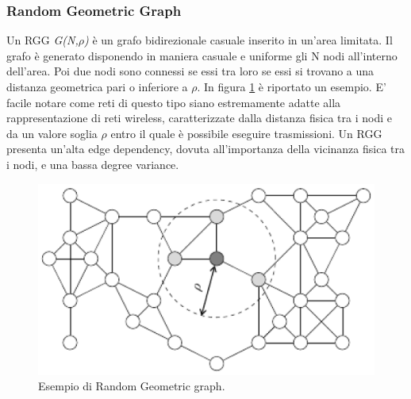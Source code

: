 \subsubsection{Random Geometric Graph}
\label{subsubsec:rgg}
Un \acf{RGG} \textit{G(N,$ \rho $)} è un grafo bidirezionale casuale inserito in un'area limitata. Il grafo è generato disponendo in maniera casuale e uniforme gli N nodi all'interno dell'area. Poi due nodi sono connessi se essi tra loro se essi si trovano a una distanza geometrica pari o inferiore a \textit{$ \rho $}. In figura \ref{fig:RandomGeometricGraph} è riportato un esempio. E' facile notare come reti di questo tipo siano estremamente adatte alla rappresentazione di reti wireless, caratterizzate dalla distanza fisica tra i nodi e da un valore soglia \textit{$ \rho $} entro il quale è possibile eseguire trasmissioni. Un \acs{RGG} presenta un'alta edge dependency, dovuta all'importanza della vicinanza fisica tra i nodi, e una bassa degree variance.
\begin{figure}[h]
	\centering
	\includegraphics[width=0.7\linewidth,keepaspectratio]{Images/reti/RandomGeometricGraph}
	\caption[Random Geometric grah]{Esempio di Random Geometric graph.}
	\label{fig:RandomGeometricGraph}
\end{figure}
\bigskip

